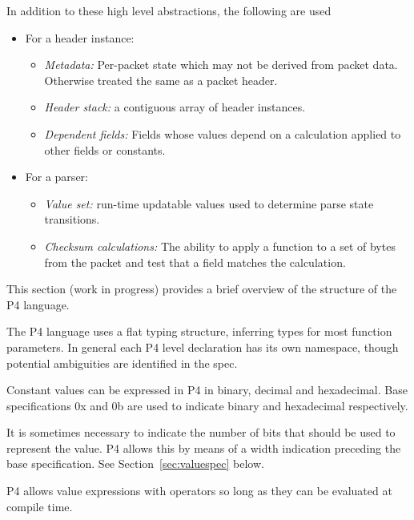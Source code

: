 \documentclass[12pt]{article}
\begin{document}
In addition to these high level abstractions, the following are used

\begin{itemize}
\item
For a header instance:
\begin{itemize}
\item
\textit{Metadata:} Per-packet state which may not be derived from
packet data. Otherwise treated the same as a packet header.
\item
\textit{Header stack:} a contiguous array of header instances.
\item
\textit{Dependent fields:} Fields whose values depend on a calculation
applied to other fields or constants.
\end{itemize}

\item
For a parser:

\begin{itemize}
\item
\textit{Value set:} run-time updatable values used to determine parse
state transitions.
\item
\textit{Checksum calculations:} The ability to apply a function to a
set of bytes from the packet and test that a field matches the
calculation.
\end{itemize}

\end{itemize}


This section (work in progress) provides a brief overview of the structure 
of the P4 language. 

The P4 language uses a flat typing structure, inferring types for most function 
parameters. In general each P4 level declaration has its own namespace, though 
potential ambiguities are identified in the spec.

Constant values can be expressed in P4 in binary, decimal and hexadecimal.
Base specifications 0x and 0b are used to indicate binary and hexadecimal
respectively. 

It is sometimes necessary to indicate the number of bits that should be used 
to represent the value.  P4 allows this by means of a width indication preceding 
the base specification. See Section~\ref{sec:valuespec} below.

P4 allows value expressions with operators so long as they can be evaluated 
at compile time.

\end{document}
